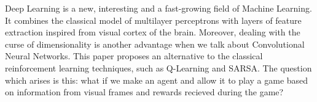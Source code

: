 
Deep Learning is a new, interesting and a fast-growing field of Machine Learning. It combines the classical model of multilayer perceptrons with layers of feature extraction inspired from visual cortex of the brain. Moreover, dealing with the curse of dimensionality is another advantage when we talk about Convolutional Neural Networks. This paper proposes an alternative to the classical reinforcement learning techniques, such as Q-Learning and SARSA. The question which arises is this: what if we make an agent and allow it to play a game based on information from visual frames and rewards recieved during the game?
